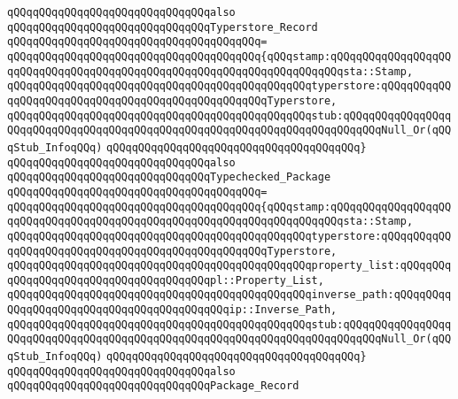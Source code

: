 \newline
\verb|qQQqqQQqqQQqqQQqqQQqqQQqqQQqqQQqalso|\newline
\verb|qQQqqQQqqQQqqQQqqQQqqQQqqQQqqQQqTyperstore_Record|\newline
\verb|qQQqqQQqqQQqqQQqqQQqqQQqqQQqqQQqqQQqqQQq=|\newline
\verb|qQQqqQQqqQQqqQQqqQQqqQQqqQQqqQQqqQQqqQQq{qQQqstamp:qQQqqQQqqQQqqQQqqQQqqQQqqQQqqQQqqQQqqQQqqQQqqQQqqQQqqQQqqQQqqQQqqQQqqQQqsta::Stamp,|\newline
\verb|qQQqqQQqqQQqqQQqqQQqqQQqqQQqqQQqqQQqqQQqqQQqqQQqtyperstore:qQQqqQQqqQQqqQQqqQQqqQQqqQQqqQQqqQQqqQQqqQQqqQQqqQQqTyperstore,|\newline
\verb|qQQqqQQqqQQqqQQqqQQqqQQqqQQqqQQqqQQqqQQqqQQqqQQqstub:qQQqqQQqqQQqqQQqqQQqqQQqqQQqqQQqqQQqqQQqqQQqqQQqqQQqqQQqqQQqqQQqqQQqqQQqqQQqNull_Or(qQQqStub_InfoqQQq)|\newline
\verb|qQQqqQQqqQQqqQQqqQQqqQQqqQQqqQQqqQQqqQQq}|\newline
\newline
\verb|qQQqqQQqqQQqqQQqqQQqqQQqqQQqqQQqalso|\newline
\verb|qQQqqQQqqQQqqQQqqQQqqQQqqQQqqQQqTypechecked_Package|\newline
\verb|qQQqqQQqqQQqqQQqqQQqqQQqqQQqqQQqqQQqqQQq=|\newline
\verb|qQQqqQQqqQQqqQQqqQQqqQQqqQQqqQQqqQQqqQQq{qQQqstamp:qQQqqQQqqQQqqQQqqQQqqQQqqQQqqQQqqQQqqQQqqQQqqQQqqQQqqQQqqQQqqQQqqQQqqQQqsta::Stamp,|\newline
\verb|qQQqqQQqqQQqqQQqqQQqqQQqqQQqqQQqqQQqqQQqqQQqqQQqtyperstore:qQQqqQQqqQQqqQQqqQQqqQQqqQQqqQQqqQQqqQQqqQQqqQQqqQQqTyperstore,|\newline
\verb|qQQqqQQqqQQqqQQqqQQqqQQqqQQqqQQqqQQqqQQqqQQqqQQqproperty_list:qQQqqQQqqQQqqQQqqQQqqQQqqQQqqQQqqQQqqQQqpl::Property_List,|\newline
\verb|qQQqqQQqqQQqqQQqqQQqqQQqqQQqqQQqqQQqqQQqqQQqqQQqinverse_path:qQQqqQQqqQQqqQQqqQQqqQQqqQQqqQQqqQQqqQQqqQQqip::Inverse_Path,|\newline
\verb|qQQqqQQqqQQqqQQqqQQqqQQqqQQqqQQqqQQqqQQqqQQqqQQqstub:qQQqqQQqqQQqqQQqqQQqqQQqqQQqqQQqqQQqqQQqqQQqqQQqqQQqqQQqqQQqqQQqqQQqqQQqqQQqNull_Or(qQQqStub_InfoqQQq)|\newline
\verb|qQQqqQQqqQQqqQQqqQQqqQQqqQQqqQQqqQQqqQQq}|\newline
\newline
\verb|qQQqqQQqqQQqqQQqqQQqqQQqqQQqqQQqalso|\newline
\verb|qQQqqQQqqQQqqQQqqQQqqQQqqQQqqQQqPackage_Record|\newline
